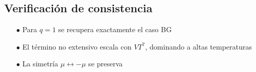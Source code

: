 \subsection*{Verificación de consistencia}
\begin{itemize}
    \item[$\bullet$] Para $q=1$ se recupera exactamente el caso BG
    \item[$\bullet$] El término no extensivo escala con $V T^7$, dominando a altas temperaturas
    \item[$\bullet$] La simetría $\mu \leftrightarrow -\mu$ se preserva
\end{itemize}